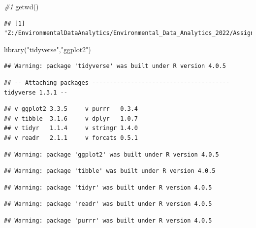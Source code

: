 \documentclass[
]{article}
\newenvironment{Shaded}{\begin{snugshade}}{\end{snugshade}}
\newcommand{\CommentTok}[1]{\textcolor[rgb]{0.56,0.35,0.01}{\textit{#1}}}
\newcommand{\FunctionTok}[1]{\textcolor[rgb]{0.00,0.00,0.00}{#1}}
\newcommand{\NormalTok}[1]{#1}
\newcommand{\StringTok}[1]{\textcolor[rgb]{0.31,0.60,0.02}{#1}}
\begin{document}
\begin{Shaded}
\begin{Highlighting}[]
\CommentTok{\#1 }
\FunctionTok{getwd}\NormalTok{()}
\end{Highlighting}
\end{Shaded}

\begin{verbatim}
## [1] "Z:/EnvironmentalDataAnalytics/Environmental_Data_Analytics_2022/Assignments"
\end{verbatim}

\begin{Shaded}
\begin{Highlighting}[]
\FunctionTok{library}\NormalTok{(}\StringTok{"tidyverse"}\NormalTok{,}\StringTok{"ggplot2"}\NormalTok{)}
\end{Highlighting}
\end{Shaded}

\begin{verbatim}
## Warning: package 'tidyverse' was built under R version 4.0.5
\end{verbatim}

\begin{verbatim}
## -- Attaching packages --------------------------------------- tidyverse 1.3.1 --
\end{verbatim}

\begin{verbatim}
## v ggplot2 3.3.5     v purrr   0.3.4
## v tibble  3.1.6     v dplyr   1.0.7
## v tidyr   1.1.4     v stringr 1.4.0
## v readr   2.1.1     v forcats 0.5.1
\end{verbatim}

\begin{verbatim}
## Warning: package 'ggplot2' was built under R version 4.0.5
\end{verbatim}

\begin{verbatim}
## Warning: package 'tibble' was built under R version 4.0.5
\end{verbatim}

\begin{verbatim}
## Warning: package 'tidyr' was built under R version 4.0.5
\end{verbatim}

\begin{verbatim}
## Warning: package 'readr' was built under R version 4.0.5
\end{verbatim}

\begin{verbatim}
## Warning: package 'purrr' was built under R version 4.0.5
\end{verbatim}
\end{document}
